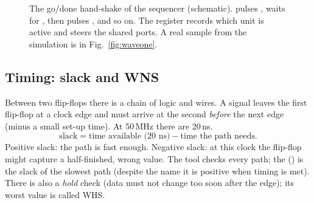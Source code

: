 \documentclass[11pt]{article}
\newcommand{\mods}[1]{\texttt{\detokenize{#1}}}   %
\begin{document}
\begin{figure}[H]
\centering
{}
\caption{The go/done hand-shake of the sequencer (schematic). \mods{v6_core} pulses \mods{fe_go}, waits for \mods{fe_done}, then pulses \mods{mat_go}, and so on. The register \mods{ph} records which unit is active and steers the shared ports. A real sample from the simulation is in Fig.~\ref{fig:waveone}.}
\label{fig:handshake}
\end{figure}

\subsection{Timing: slack and WNS}\label{sec:timing}
Between two flip-flops there is a chain of logic and wires. A signal leaves the first flip-flop at a clock edge and must arrive at the second \emph{before} the next edge (minus a small set-up time). At 50\,MHz there are 20\,ns.
\[
\text{slack} = \text{time available (20 ns)} - \text{time the path needs}.
\]
Positive slack: the path is fast enough. Negative slack: at this clock the flip-flop might capture a half-finished, wrong value. The tool checks every path; the  () is the slack of the slowest path (despite the name it is positive when timing is met). There is also a \emph{hold} check (data must not change too soon after the edge); its worst value is called WHS.
\end{document}
